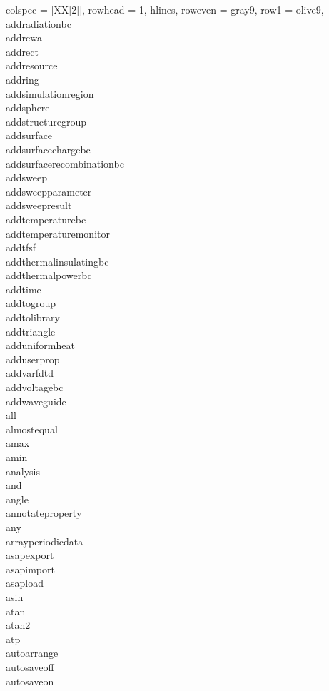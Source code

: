 \begin{longtblr}[
  caption = {Long Title},
  label = {tab:commands},
]{
  colspec = {|XX[2]|},
  rowhead = 1,
  hlines,
  row{even} = {gray9},
  row{1} = {olive9},
}
addradiationbc\\
addrcwa\\
addrect\\
addresource\\
addring\\
addsimulationregion\\
addsphere\\
addstructuregroup\\
addsurface\\
addsurfacechargebc\\
addsurfacerecombinationbc\\
addsweep\\
addsweepparameter\\
addsweepresult\\
addtemperaturebc\\
addtemperaturemonitor\\
addtfsf\\
addthermalinsulatingbc\\
addthermalpowerbc\\
addtime\\
addtogroup\\
addtolibrary\\
addtriangle\\
adduniformheat\\
adduserprop\\
addvarfdtd\\
addvoltagebc\\
addwaveguide\\
all\\
almostequal\\
amax\\
amin\\
analysis\\
and\\
angle\\
annotateproperty\\
any\\
arrayperiodicdata\\
asapexport\\
asapimport\\
asapload\\
asin\\
atan\\
atan2\\
atp\\
autoarrange\\
autosaveoff\\
autosaveon\\
\end{longtblr}

